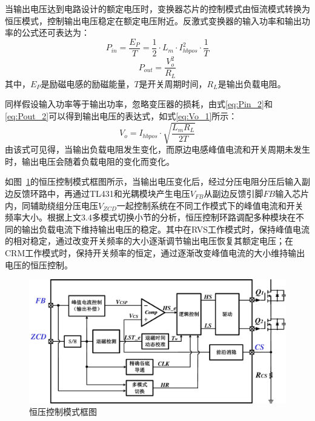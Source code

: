 当输出电压达到电路设计的额定电压时，变换器芯片的控制模式由恒流模式转换为恒压模式，控制输出电压稳定在额定电压附近。反激式变换器的输入功率和输出功率的公式还可表达为：
\begin{equation}
    \label{eq:Pin_2}
    P_{in} = \frac{E_P}{T}=\frac{1}{2} \cdot L_m \cdot I_{hbpos}^2 \cdot \frac{1}{T}
\end{equation}
\begin{equation}
    \label{eq:Pout_2}
    P_{out} = \frac{V_o^2}{R_L} 
\end{equation}
其中，$E_P$是励磁电感的励磁能量，$T$是开关周期时间，$R_L$是输出负载电阻。

同样假设输入功率等于输出功率，忽略变压器的损耗，由式\eqref{eq:Pin_2}和\eqref{eq:Pout_2}可以得到输出电压的表达式，如式\eqref{eq:Vo_1}所示：
\begin{equation}
    \label{eq:Vo_1}
    V_o = I_{hbpos} \cdot \sqrt{\frac{L_m R_L}{2T}}
\end{equation}
由该式可见得，当输出负载电阻发生变化，而原边电感峰值电流和开关周期未发生时，输出电压会随着负载电阻的变化而变化。

如图~\ref{fig:恒压控制模式框图}的恒压控制模式框图所示，当输出电压变化后，经过分压电阻分压后输入副边反馈环路中，再通过TL431和光耦模块产生电压$V_{FB}$从副边反馈引脚$FB$输入芯片内，同辅助绕组分压电压$V_{ZCD}$一起控制系统在不同工作模式下的峰值电流和开关频率大小。根据上文3.4多模式切换小节的分析，恒压控制环路调配多种模块在不同的输出负载电流下维持输出电压的稳定。其中在RVS工作模式时，保持峰值电流的相对稳定，通过改变开关频率的大小逐渐调节输出电压恢复其额定电压；在CRM工作模式时，保持开关频率的恒定，通过逐渐改变峰值电流的大小维持输出电压的恒压控制。

\begin{figure}[htbp] 
    \centering
    \includegraphics[width=1.0\linewidth]{figures/恒压环路框图.pdf}
    \caption{恒压控制模式框图}
    \label{fig:恒压控制模式框图}
\end{figure}


